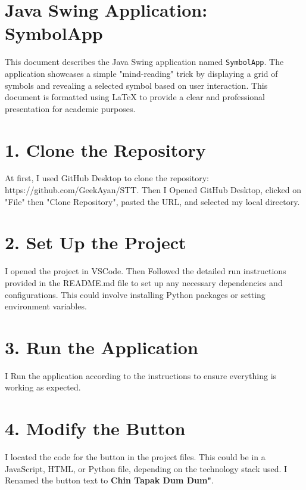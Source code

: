 \documentclass[12pt, a4paper]{article}
\begin{document}

\section*{Java Swing Application: SymbolApp}
This document describes the Java Swing application named \texttt{SymbolApp}. The application showcases a simple "mind-reading" trick by displaying a grid of symbols and revealing a selected symbol based on user interaction. This document is formatted using LaTeX to provide a clear and professional presentation for academic purposes.

\section*{ 1. Clone the Repository}
At first, I used GitHub Desktop to clone the repository: https://github.com/GeekAyan/STT.
Then I Opened GitHub Desktop, clicked on "File" then "Clone Repository", pasted the URL, and selected my local directory.

\section*{  2. Set Up the Project}
I opened the project in VSCode.
Then Followed the detailed run instructions provided in the README.md file to set up any necessary dependencies and configurations. This could involve installing Python packages or setting environment variables.

\section*{ 3. Run the Application}
I Run the application according to the instructions to ensure everything is working as expected.

\section*{ 4. Modify the Button}
I located the code for the button in the project files. This could be in a JavaScript, HTML, or Python file, depending on the technology stack used.
I Renamed the button text to \textbf{Chin Tapak Dum Dum"}.
  
\end{document}
